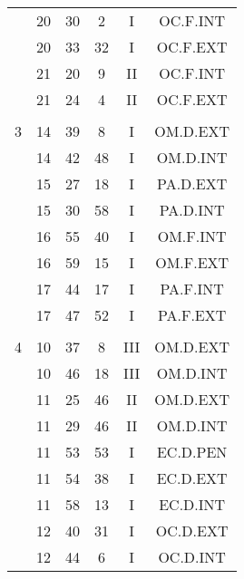 \documentclass[12pt, a4paper]{article}
\begin{document}
\begin{multicols}{3}
{\begin{tabular}{c c c c c c}
	 	 	 	 & 20 & 30 & 2 & I & OC.F.INT\\%
	 	 	 	 & 20 & 33 & 32 & I & OC.F.EXT\\%
	 	 	 	 & 21 & 20 & 9 & II & OC.F.INT\\%
	 	 	 	 & 21 & 24 & 4 & II & OC.F.EXT\\%
	 	 	 	 & & & & & \\%
	 	 	 	3 & 14 & 39 & 8 & I & OM.D.EXT\\%
	 	 	 	 & 14 & 42 & 48 & I & OM.D.INT\\%
	 	 	 	 & 15 & 27 & 18 & I & PA.D.EXT\\%
	 	 	 	 & 15 & 30 & 58 & I & PA.D.INT\\%
	 	 	 	 & 16 & 55 & 40 & I & OM.F.INT\\%
	 	 	 	 & 16 & 59 & 15 & I & OM.F.EXT\\%
	 	 	 	 & 17 & 44 & 17 & I & PA.F.INT\\%
	 	 	 	 & 17 & 47 & 52 & I & PA.F.EXT\\%
	 	 	 	 & & & & & \\%
	 	 	 	4 & 10 & 37 & 8 & III & OM.D.EXT\\%
	 	 	 	 & 10 & 46 & 18 & III & OM.D.INT\\%
	 	 	 	 & 11 & 25 & 46 & II & OM.D.EXT\\%
	 	 	 	 & 11 & 29 & 46 & II & OM.D.INT\\%
	 	 	 	 & 11 & 53 & 53 & I & EC.D.PEN\\%
	 	 	 	 & 11 & 54 & 38 & I & EC.D.EXT\\%
	 	 	 	 & 11 & 58 & 13 & I & EC.D.INT\\%
	 	 	 	 & 12 & 40 & 31 & I & OC.D.EXT\\%
	 	 	 	 & 12 & 44 & 6 & I & OC.D.INT\\%

\end{tabular}}
\end{multicols}
\end{document}
